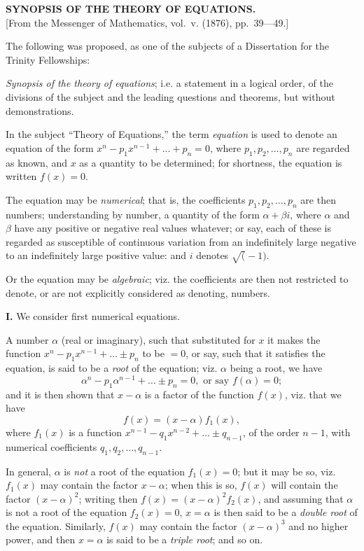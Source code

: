 \documentclass[12pt,a4paper]{article}
\theoremstyle{plain}
\theoremstyle{definition}
\theoremstyle{remark}
\begin{document}
\begin{center}
\textbf{SYNOPSIS OF THE THEORY OF EQUATIONS.}\\[1em]
[From the Messenger of Mathematics, vol.~v. (1876), pp.~39---49.]
\end{center}

The following was proposed, as one of the subjects of a Dissertation for the Trinity Fellowships:

\textit{Synopsis of the theory of equations}; i.e. a statement in a logical order, of the divisions of the subject and the leading questions and theorems, but without demonstrations.

In the subject ``Theory of Equations,'' the term \textit{equation} is used to denote an equation of the form $x^n - p_1 x^{n-1} + \ldots + p_n = 0$, where $p_1, p_2, \ldots, p_n$ are regarded as known, and $x$ as a quantity to be determined; for shortness, the equation is written $f(x) = 0$.

The equation may be \textit{numerical}; that is, the coefficients $p_1, p_2, \ldots, p_n$ are then numbers; understanding by number, a quantity of the form $\alpha + \beta i$, where $\alpha$ and $\beta$ have any positive or negative real values whatever; or say, each of these is regarded as susceptible of continuous variation from an indefinitely large negative to an indefinitely large positive value: and $i$ denotes $\surd(-1)$.

Or the equation may be \textit{algebraic}; viz. the coefficients are then not restricted to denote, or are not explicitly considered as denoting, numbers.

\medskip\noindent\textbf{I.} We consider first numerical equations.

A number $\alpha$ (real or imaginary), such that substituted for $x$ it makes the function $x^n - p_1 x^{n-1} + \ldots \pm p_n$ to be $=0$, or say, such that it satisfies the equation, is said to be a \textit{root} of the equation; viz. $\alpha$ being a root, we have
\[
\alpha^n - p_1 \alpha^{n-1} + \ldots \pm p_n = 0, \text{ or say } f(\alpha) = 0;
\]
and it is then shown that $x - \alpha$ is a factor of the function $f(x)$, viz. that we have
\[
f(x) = (x-\alpha)f_1(x),
\]
where $f_1(x)$ is a function $x^{n-1} - q_1 x^{n-2} + \ldots \pm q_{n-1}$, of the order $n-1$, with numerical coefficients $q_1, q_2, \ldots, q_{n-1}$.

In general, $\alpha$ is \textit{not} a root of the equation $f_1(x) = 0$; but it may be so, viz. $f_1(x)$ may contain the factor $x - \alpha$; when this is so, $f(x)$ will contain the factor $(x-\alpha)^2$; writing then $f(x) = (x-\alpha)^2 f_2(x)$, and assuming that $\alpha$ is not a root of the equation $f_2(x) = 0$, $x = \alpha$ is then said to be a \textit{double root} of the equation. Similarly, $f(x)$ may contain the factor $(x-\alpha)^3$ and no higher power, and then $x = \alpha$ is said to be a \textit{triple root}; and so on.
\end{document}
